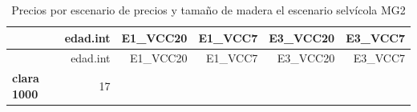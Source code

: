 \documentclass[]{article}
\begin{document}
\begin{longtable}[]{@{}lrrrrr@{}}
\caption{Precios por escenario de precios y tamaño de madera el
escenario selvícola MG2}\tabularnewline
\toprule
\begin{minipage}[b]{0.21\columnwidth}\raggedright\strut
~\strut
\end{minipage} & \begin{minipage}[b]{0.13\columnwidth}\raggedleft\strut
edad.int\strut
\end{minipage} & \begin{minipage}[b]{0.13\columnwidth}\raggedleft\strut
E1\_VCC20\strut
\end{minipage} & \begin{minipage}[b]{0.12\columnwidth}\raggedleft\strut
E1\_VCC7\strut
\end{minipage} & \begin{minipage}[b]{0.13\columnwidth}\raggedleft\strut
E3\_VCC20\strut
\end{minipage} & \begin{minipage}[b]{0.13\columnwidth}\raggedleft\strut
E3\_VCC7\strut
\end{minipage}\tabularnewline
\midrule
\endfirsthead
\toprule
\begin{minipage}[b]{0.21\columnwidth}\raggedright\strut
~\strut
\end{minipage} & \begin{minipage}[b]{0.13\columnwidth}\raggedleft\strut
edad.int\strut
\end{minipage} & \begin{minipage}[b]{0.13\columnwidth}\raggedleft\strut
E1\_VCC20\strut
\end{minipage} & \begin{minipage}[b]{0.12\columnwidth}\raggedleft\strut
E1\_VCC7\strut
\end{minipage} & \begin{minipage}[b]{0.13\columnwidth}\raggedleft\strut
E3\_VCC20\strut
\end{minipage} & \begin{minipage}[b]{0.13\columnwidth}\raggedleft\strut
E3\_VCC7\strut
\end{minipage}\tabularnewline
\midrule
\endhead
\begin{minipage}[t]{0.21\columnwidth}\raggedright\strut
\textbf{clara 1000}\strut
\end{minipage} & \begin{minipage}[t]{0.13\columnwidth}\raggedleft\strut
17\strut
\end{minipage} & \begin{minipage}[t]{0.13\columnwidth}\raggedleft\strut

\end{minipage}
\end{longtable}
\end{document}

